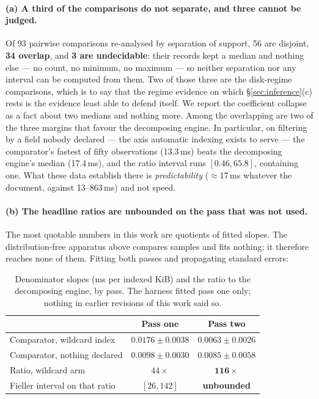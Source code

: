 \documentclass[11pt,a4paper]{article}
\begin{document}
\paragraph{(a) A third of the comparisons do not separate, and three cannot be judged.} Of 93
pairwise comparisons re-analysed by separation of support, 56 are disjoint, \textbf{34 overlap}, and
\textbf{3 are undecidable}: their records kept a median and nothing else --- no count, no minimum,
no maximum --- so neither separation nor any interval can be computed from them. Two of those three
are the disk-regime comparisons, which is to say that the regime evidence on which
\S\ref{sec:inference}(c) rests is the evidence least able to defend itself. We report the coefficient
collapse as a fact about two medians and nothing more. Among the overlapping are two of
the three margins that favour the decomposing engine. In particular, on filtering by a field nobody
declared --- the axis automatic indexing exists to serve --- the comparator's fastest of fifty
observations (13.3\,ms) beats the decomposing engine's median (17.4\,ms), and the ratio interval
runs $[0.46, 65.8]$, containing one. What these data establish there is \emph{predictability}
($\approx$17\,ms whatever the document, against 13--863\,ms) and not speed.

\paragraph{(b) The headline ratios are unbounded on the pass that was not used.} The most quotable
numbers in this work are quotients of fitted slopes. The distribution-free apparatus above compares
samples and fits nothing; it therefore reaches none of them. Fitting both passes and propagating
standard errors:

\begin{table}[htbp]
\centering
\small
\caption{Denominator slopes (ms per indexed KiB) and the ratio to the decomposing engine, by pass.
The harness fitted pass one only; nothing in earlier revisions of this work said so.}
\label{tab:slopes}
\begin{tabular}{lcc}
\toprule
 & Pass one & Pass two \\
\midrule
Comparator, wildcard index        & $0.0176 \pm 0.0038$ & $\mathbf{0.0063 \pm 0.0026}$ \\
Comparator, nothing declared      & $0.0098 \pm 0.0030$ & $\mathbf{0.0085 \pm 0.0058}$ \\
Ratio, wildcard arm               & $44\times$          & $\mathbf{116\times}$ \\
Fieller interval on that ratio    & $[26, 142]$         & \textbf{unbounded} \\
\bottomrule
\end{tabular}
\end{table}
\end{document}
